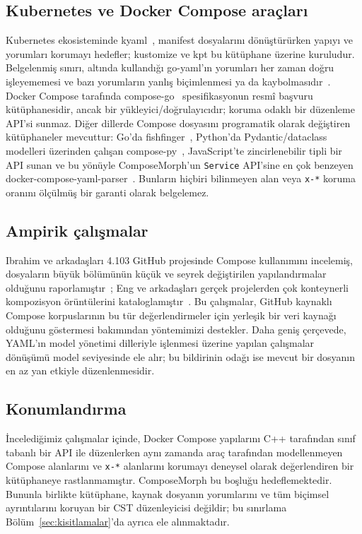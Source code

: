 \documentclass[conference]{IEEEtran}
\begin{document}
\subsection{Kubernetes ve Docker Compose araçları}
Kubernetes ekosisteminde kyaml~\cite{kyaml}, manifest dosyalarını dönüştürürken
yapıyı ve yorumları korumayı hedefler; kustomize ve kpt bu kütüphane üzerine
kuruludur. Belgelenmiş sınırı, altında kullandığı go-yaml'ın yorumları her
zaman doğru işleyememesi ve bazı yorumların yanlış biçimlenmesi ya da
kaybolmasıdır~\cite{kustomize_issue259}. Docker Compose tarafında
compose-go~\cite{composego} spesifikasyonun resmî başvuru kütüphanesidir,
ancak bir yükleyici/doğrulayıcıdır; koruma odaklı bir düzenleme API'si
sunmaz. Diğer dillerde Compose dosyasını programatik olarak değiştiren
kütüphaneler mevcuttur: Go'da fishfinger~\cite{fishfinger}, Python'da
Pydantic/dataclass modelleri üzerinden çalışan compose-py~\cite{composepy},
JavaScript'te zincirlenebilir tipli bir API sunan ve bu yönüyle
ComposeMorph'un \texttt{Service} API'sine en çok benzeyen
docker-compose-yaml-parser~\cite{dockercomposeyamlparser}. Bunların hiçbiri
bilinmeyen alan veya \texttt{x-*} koruma oranını ölçülmüş bir garanti
olarak belgelemez.

\subsection{Ampirik çalışmalar}
Ibrahim ve arkadaşları 4.103 GitHub projesinde Compose kullanımını
incelemiş, dosyaların büyük bölümünün küçük ve seyrek değiştirilen
yapılandırmalar olduğunu raporlamıştır~\cite{ibrahim2021dockercompose};
Eng ve arkadaşları gerçek projelerden çok konteynerli kompozisyon
örüntülerini kataloglamıştır~\cite{eng2024patterns}. Bu çalışmalar,
GitHub kaynaklı Compose korpuslarının bu tür değerlendirmeler için
yerleşik bir veri kaynağı olduğunu göstermesi bakımından yöntemimizi
destekler. Daha geniş çerçevede, YAML'ın model yönetimi dilleriyle
işlenmesi üzerine yapılan çalışmalar~\cite{predoaia2024yaml} dönüşümü model
seviyesinde ele alır; bu bildirinin odağı ise mevcut bir dosyanın en az yan
etkiyle düzenlenmesidir.

\subsection{Konumlandırma}
İncelediğimiz çalışmalar içinde, Docker Compose yapılarını C++ tarafından
sınıf tabanlı bir API ile düzenlerken aynı zamanda araç tarafından
modellenmeyen Compose alanlarını ve \texttt{x-*} alanlarını korumayı
deneysel olarak değerlendiren bir kütüphaneye rastlanmamıştır. ComposeMorph
bu boşluğu hedeflemektedir. Bununla birlikte kütüphane, kaynak dosyanın
yorumlarını ve tüm biçimsel ayrıntılarını koruyan bir CST düzenleyicisi
değildir; bu sınırlama Bölüm~\ref{sec:kisitlamalar}'da ayrıca ele
alınmaktadır.
\end{document}
